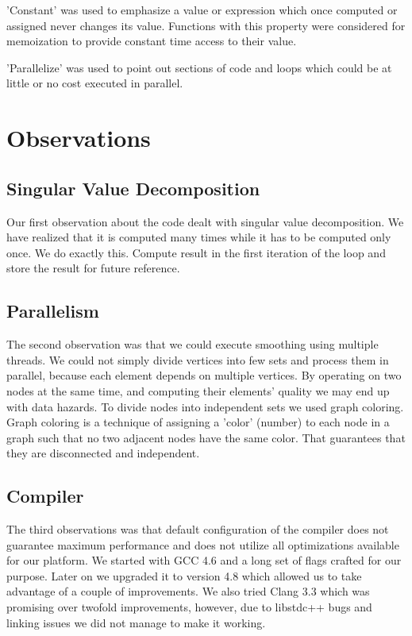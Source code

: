 \documentclass[conference]{IEEEtran}
\begin{document}
'Constant' was used to emphasize a value or expression which once computed or assigned never changes its value. Functions with this property were considered for memoization to provide constant time access to their value.

'Parallelize' was used to point out sections of code and loops which could be at little or no cost executed in parallel.

\section{Observations}

\subsection{Singular Value Decomposition}
Our first observation about the code dealt with singular value decomposition. We have realized that it is computed many times while it has to be computed only once. We do exactly this. Compute result in the first iteration of the loop and store the result for future reference.

\subsection{Parallelism}
The second observation was that we could execute smoothing using multiple threads.
We could not simply divide vertices into few sets and process them in parallel, because each element depends on multiple vertices.
By operating on two nodes at the same time, and computing their elements' quality we may end up with data hazards.
To divide nodes into independent sets we used graph coloring.
Graph coloring is a technique of assigning a 'color' (number) to each node in a graph such that no two adjacent nodes have the same color.
That guarantees that they are disconnected and independent.

\subsection{Compiler}
The third observations was that default configuration of the compiler does not guarantee maximum performance and does not utilize all optimizations available for our platform.
We started with GCC 4.6 and a long set of flags crafted for our purpose.
Later on we upgraded it to version 4.8 which allowed us to take advantage of a couple of improvements.
We also tried Clang 3.3 which was promising over twofold improvements, however, due to libstdc++ bugs and linking issues we did not manage to make it working.
\end{document}
